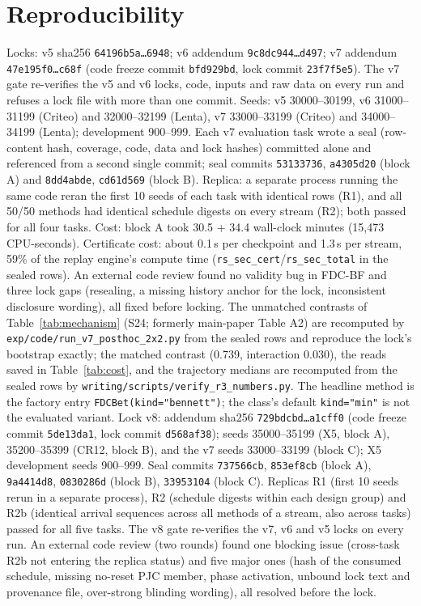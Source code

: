 \documentclass[sigconf,anonymous,review]{acmart}
\begin{document}
\section{Reproducibility}\label{app:repro}

{\sloppy Locks: v5 sha256 \texttt{64196b5a\ldots6948}; v6 addendum \texttt{9c8dc944\ldots d497}; v7 addendum \texttt{47e195f0\ldots c68f} (code freeze commit \texttt{bfd929bd}, lock commit \texttt{23f7f5e5}). The v7 gate re-verifies the v5 and v6 locks, code, inputs and raw data on every run and refuses a lock file with more than one commit. Seeds: v5 30000--30199, v6 31000--31199 (Criteo) and 32000--32199 (Lenta), v7 33000--33199 (Criteo) and 34000--34199 (Lenta); development 900--999. Each v7 evaluation task wrote a seal (row-content hash, coverage, code, data and lock hashes) committed alone and referenced from a second single commit; seal commits \texttt{53133736}, \texttt{a4305d20} (block A) and \texttt{8dd4abde}, \texttt{cd61d569} (block B). Replica: a separate process running the same code reran the first 10 seeds of each task with identical rows (R1), and all 50/50 methods had identical schedule digests on every stream (R2); both passed for all four tasks. Cost: block A took 30.5 + 34.4 wall-clock minutes (15,473 CPU-seconds). Certificate cost: about 0.1\,s per checkpoint and 1.3\,s per stream, 59\% of the replay engine's compute time (\texttt{rs\_sec\_cert}/\texttt{rs\_sec\_total} in the sealed rows). An external code review found no validity bug in FDC-BF and three lock gaps (resealing, a missing history anchor for the lock, inconsistent disclosure wording), all fixed before locking. The unmatched contrasts of Table~\ref{tab:mechanism} (S24; formerly main-paper Table A2) are recomputed by \texttt{exp/code/run\_v7\_posthoc\_2x2.py} from the sealed rows and reproduce the lock's bootstrap exactly; the matched contrast (0.739, interaction 0.030), the reads saved in Table~\ref{tab:cost}, and the trajectory medians are recomputed from the sealed rows by \texttt{writing/scripts/verify\_r3\_numbers.py}. The headline method is the factory entry \texttt{FDCBet(kind="bennett")}; the class's default \texttt{kind="min"} is not the evaluated variant. Lock v8: addendum sha256 \texttt{729bdcbd\ldots a1cff0} (code freeze commit \texttt{5de13da1}, lock commit \texttt{d568af38}); seeds 35000--35199 (X5, block A), 35200--35399 (CR12, block B), and the v7 seeds 33000--33199 (block C); X5 development seeds 900--999. Seal commits \texttt{737566cb}, \texttt{853ef8cb} (block A), \texttt{9a4414d8}, \texttt{0830286d} (block B), \texttt{33953104} (block C). Replicas R1 (first 10 seeds rerun in a separate process), R2 (schedule digests within each design group) and R2b (identical arrival sequences across all methods of a stream, also across tasks) passed for all five tasks. The v8 gate re-verifies the v7, v6 and v5 locks on every run. An external code review (two rounds) found one blocking issue (cross-task R2b not entering the replica status) and five major ones (hash of the consumed schedule, missing no-reset PJC member, phase activation, unbound lock text and provenance file, over-strong blinding wording), all resolved before the lock.\par}
\end{document}
